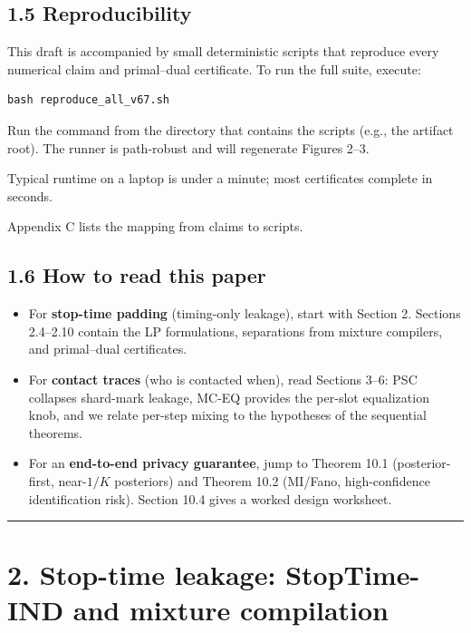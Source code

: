 \documentclass[11pt]{article}
\providecommand{\tightlist}{%
  \setlength{\itemsep}{0pt}\setlength{\parskip}{0pt}}
\begin{document}
\hypertarget{reproducibility}{%
\subsection{1.5 Reproducibility}\label{reproducibility}}

This draft is accompanied by small deterministic scripts that reproduce
every numerical claim and primal--dual certificate. To run the full
suite, execute:

\begin{verbatim}
bash reproduce_all_v67.sh
\end{verbatim}

Run the command from the directory that contains the scripts (e.g., the
artifact root). The runner is path-robust and will regenerate Figures
2--3.

Typical runtime on a laptop is under a minute; most certificates
complete in seconds.

Appendix C lists the mapping from claims to scripts.

\hypertarget{how-to-read-this-paper}{%
\subsection{1.6 How to read this paper}\label{how-to-read-this-paper}}

\begin{itemize}
\tightlist
\item
  For \textbf{stop-time padding} (timing-only leakage), start with
  Section 2. Sections 2.4--2.10 contain the LP formulations, separations
  from mixture compilers, and primal--dual certificates.
\item
  For \textbf{contact traces} (who is contacted when), read Sections
  3--6: PSC collapses shard-mark leakage, MC-EQ provides the per-slot
  equalization knob, and we relate per-step mixing to the hypotheses of
  the sequential theorems.
\item
  For an \textbf{end-to-end privacy guarantee}, jump to Theorem 10.1
  (posterior-first, near-\(1/K\) posteriors) and Theorem 10.2 (MI/Fano,
  high-confidence identification risk). Section 10.4 gives a worked
  design worksheet.
\end{itemize}

\begin{center}\rule{0.5\linewidth}{0.5pt}\end{center}

\hypertarget{stop-time-leakage-stoptime-ind-and-mixture-compilation}{%
\section{2. Stop-time leakage: StopTime-IND and mixture
compilation}\label{stop-time-leakage-stoptime-ind-and-mixture-compilation}}
\end{document}
